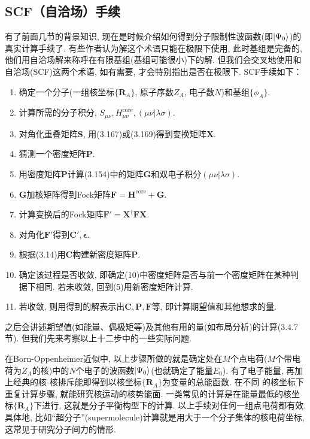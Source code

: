 \subsection{SCF（自洽场）手续}
有了前面几节的背景知识, 现在是时候介绍如何得到分子限制性波函数(即$\Ket{\Psi_0}$)的真实计算手续了. 有些作者认为\hft 解这个术语只能在\hft 极限下使用, 此时基组是完备的, 他们用自洽场解来称呼在有限基组(基组可能很小)下的解. 但我们会交叉地使用\hft 和自洽场(SCF)这两个术语, 如有需要, 才会特别指出是否在\hft 极限下. SCF手续如下：
\begin{enumerate}[1.]
	\item 确定一个分子(一组核坐标$\{\mathbf{R}_A\}$, 原子序数$Z_A$, 电子数$N$)和基组$\{\phi_A\}$.
	\item 计算所需的分子积分, $S_{\mu\nu},H_{\mu\nu}^\mathrm{core}, (\mu\nu|\lambda\sigma)$.
	\item 对角化重叠矩阵$\mathbf{S}$, 用(3.167)或(3.169)得到变换矩阵$\mathbf{X}$.
	\item 猜测一个密度矩阵$\mathbf{P}$.
	\item 用密度矩阵$\mathbf{P}$计算(3.154)中的矩阵$\mathbf{G}$和双电子积分$(\mu\nu|\lambda\sigma)$.
	\item $\mathbf{G}$加核\ha 矩阵得到Fock矩阵$\mathbf{F=H}^\mathrm{core}+\mathbf{G}$.
	\item 计算变换后的Fock矩阵$\mathbf{F'=X^\dagger FX}$.
	\item 对角化$\mathbf{F'}$得到$\mathbf{C'},\bm{\epsilon}$.
	\item 根据(3.14)用$\mathbf{C}$构建新密度矩阵$\mathbf{P}$.
	\item 确定该过程是否收敛, 即确定(10)中密度矩阵是否与前一个密度矩阵在某种判据下相同. 若未收敛, 回到(5)用新密度矩阵计算.
	\item 若收敛, 则用得到的解表示出$\mathbf{C,P,F}$等, 即计算期望值和其他想求的量.
\end{enumerate}
之后会讲述期望值(如能量、偶极矩等)及其他有用的量(如布局分析)的计算(3.4.7节). 但我们先来考察以上十二步中的一些实际问题.

在Born-Oppenheimer近似中, 以上步骤所做的就是确定处在$M$个点电荷($M$个带电荷为$Z_A$的核)中的$N$个电子的波函数$\Ket{\Psi_0}$(也就确定了能量$E_0$). 有了电子能量, 再加上经典的核-核排斥能即得到以核坐标$\{\mathbf{R}_A\}$为变量的总能函数. 在不同 的核坐标下重复计算步骤, 就能研究核运动的核势能面. 一类常见的计算是在能量最低的核坐标$\{\mathbf{R}_A\}$下进行, 这就是分子平衡构型下的计算. 以上手续对任何一组点电荷都有效. 具体地, 比如``超分子''(supermolecule)计算就是用大于一个分子集体的核电荷坐标, 这常见于研究分子间力的情形.


